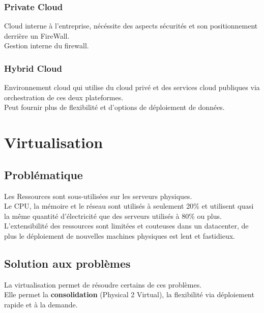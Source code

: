 \documentclass{report}
\begin{document}
		\subsection{Private Cloud}

			Cloud interne à l'entreprise, nécéssite des aspects sécurités et son positionnement derrière un FireWall.\\
			Gestion interne du firewall.\\

		\subsection{Hybrid Cloud}

			Environnement cloud qui utilise du cloud privé et des services cloud publiques via orchestration de ces deux plateformes.\\
			Peut fournir plus de flexibilité et d'options de déploiement de données.\\

\chapter{Virtualisation}

	\section{Problématique}

		Les Ressources sont sous-utilisées sur les serveurs physiques.\\
		Le CPU, la mémoire et le réseau sont utilisés à seulement 20\% et utilisent quasi la même quantité d'électricité que des serveurs utilisés à 80\% ou plus.\\

		L'extensibilité des ressources sont limitées et couteuses dans un datacenter, de plus le déploiement de nouvelles machines physiques est lent et fastidieux.\\

	\section{Solution aux problèmes}

		La virtualisation permet de résoudre certains de ces problèmes.\\
		Elle permet la \textbf{consolidation} (Physical 2 Virtual), la flexibilité via déploiement rapide et à la demande.\\
\end{document}
